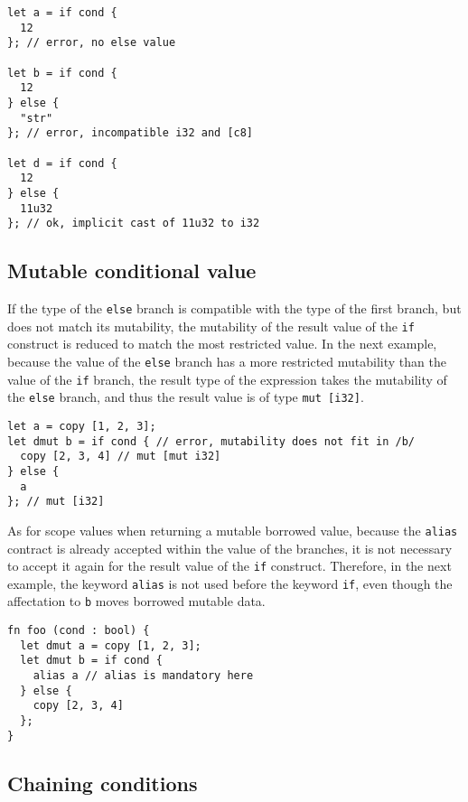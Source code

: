 \begin{lstlisting}[style=coloredverbatim]
let a = if cond {
  12
}; // error, no else value

let b = if cond {
  12
} else {
  "str"
}; // error, incompatible i32 and [c8]

let d = if cond {
  12
} else {
  11u32
}; // ok, implicit cast of 11u32 to i32
\end{lstlisting}

\subsection{Mutable conditional value}

If the type of the \texttt{else} branch is compatible with the type of the first
branch, but does not match its mutability, the mutability of the result value of
the \texttt{if} construct is reduced to match the most restricted value. In the
next example, because the value of the \texttt{else} branch has a more
restricted mutability than the value of the \texttt{if} branch, the result type
of the expression takes the mutability of the \texttt{else} branch, and thus the
result value is of type \texttt{mut [i32]}.

\begin{lstlisting}[style=coloredverbatim]
let a = copy [1, 2, 3];
let dmut b = if cond { // error, mutability does not fit in /b/
  copy [2, 3, 4] // mut [mut i32]
} else {
  a
}; // mut [i32]
\end{lstlisting}

As for scope values when returning a mutable borrowed value, because
the \texttt{alias} contract is already accepted within the value of the
branches, it is not necessary to accept it again for the result value of the
\texttt{if} construct. Therefore, in the next example, the keyword
\texttt{alias} is not used before the keyword \texttt{if}, even though the
affectation to \texttt{b} moves borrowed mutable data.

\begin{lstlisting}[style=coloredverbatim]
fn foo (cond : bool) {
  let dmut a = copy [1, 2, 3];
  let dmut b = if cond {
    alias a // alias is mandatory here
  } else {
    copy [2, 3, 4]
  };
}
\end{lstlisting}


\subsection{Chaining conditions}

